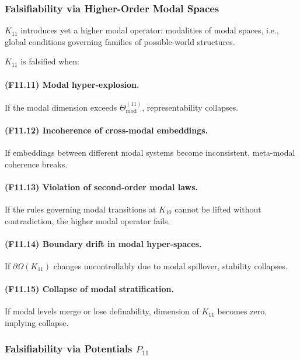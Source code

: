 \subsubsection{Falsifiability via Higher-Order Modal Spaces}

$K_{11}$ introduces yet a higher modal operator:
modalities of modal spaces, i.e., global conditions governing families of
possible-world structures.

$K_{11}$ is falsified when:

\paragraph{(F11.11) Modal hyper-explosion.}
If the modal dimension exceeds $\Theta_{\mathrm{mod}}^{(11)}$,
representability collapses.

\paragraph{(F11.12) Incoherence of cross-modal embeddings.}
If embeddings between different modal systems become inconsistent,
meta-modal coherence breaks.

\paragraph{(F11.13) Violation of second-order modal laws.}
If the rules governing modal transitions at $K_{10}$ cannot be lifted
without contradiction, the higher modal operator fails.

\paragraph{(F11.14) Boundary drift in modal hyper-spaces.}
If $\partial\Omega(K_{11})$ changes uncontrollably due to modal spillover,
stability collapses.

\paragraph{(F11.15) Collapse of modal stratification.}
If modal levels merge or lose definability,
dimension of $K_{11}$ becomes zero, implying collapse.



\subsubsection{Falsifiability via Potentials $P_{11}$}

